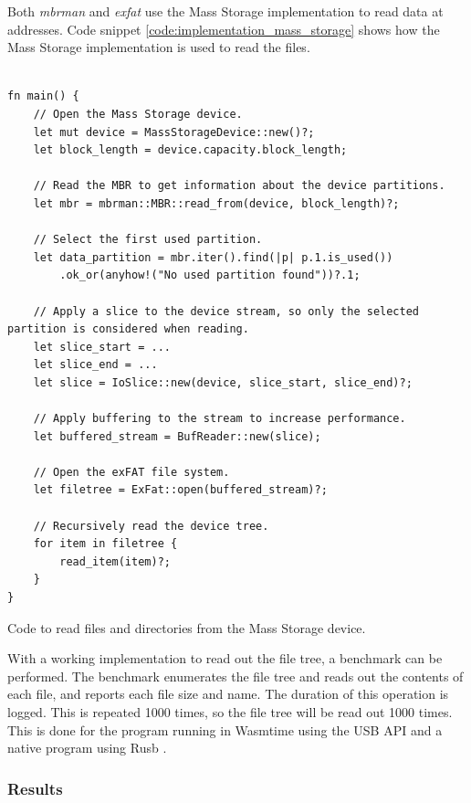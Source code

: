 Both \textit{mbrman} and \textit{exfat} use the Mass Storage implementation to read data at addresses. Code snippet \ref{code:implementation_mass_storage} shows how the Mass Storage implementation is used to read the files.

\begin{code}
\begin{verbatim}

fn main() {
    // Open the Mass Storage device.
    let mut device = MassStorageDevice::new()?;
    let block_length = device.capacity.block_length;

    // Read the MBR to get information about the device partitions.
    let mbr = mbrman::MBR::read_from(device, block_length)?;

    // Select the first used partition.
    let data_partition = mbr.iter().find(|p| p.1.is_used())
        .ok_or(anyhow!("No used partition found"))?.1;

    // Apply a slice to the device stream, so only the selected partition is considered when reading.
    let slice_start = ...
    let slice_end = ...
    let slice = IoSlice::new(device, slice_start, slice_end)?;

    // Apply buffering to the stream to increase performance.
    let buffered_stream = BufReader::new(slice);
    
    // Open the exFAT file system.
    let filetree = ExFat::open(buffered_stream)?;

    // Recursively read the device tree.
    for item in filetree {
        read_item(item)?;
    }
}
\end{verbatim}
\caption{Code to read files and directories from the Mass Storage device.}
\label{code:implementation_mass_storage}
\end{code}

With a working implementation to read out the file tree, a benchmark can be performed. The benchmark enumerates the file tree and reads out the contents of each file, and reports each file size and name. The duration of this operation is logged. This is repeated 1000 times, so the file tree will be read out 1000 times. This is done for the program running in Wasmtime using the \acrshort{USB} \acrshort{API} and a native program using Rusb \cite{rusb}.

\subsubsection{Results}

